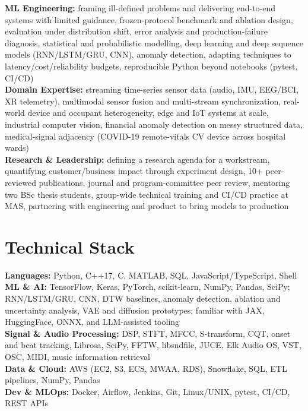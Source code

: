 \documentclass[11pt]{article}
\begin{document}
\textbf{ML Engineering:} framing ill-defined problems and delivering end-to-end systems with limited guidance, frozen-protocol benchmark and ablation design, evaluation under distribution shift, error analysis and production-failure diagnosis, statistical and probabilistic modelling, deep learning and deep sequence models (RNN/LSTM/GRU, CNN), anomaly detection, adapting techniques to latency/cost/reliability budgets, reproducible Python beyond notebooks (pytest, CI/CD)\\
\textbf{Domain Expertise:} streaming time-series sensor data (audio, IMU, EEG/BCI, XR telemetry), multimodal sensor fusion and multi-stream synchronization, real-world device and occupant heterogeneity, edge and IoT systems at scale, industrial computer vision, financial anomaly detection on messy structured data, medical-signal adjacency (COVID-19 remote-vitals CV device across hospital wards)\\
\textbf{Research \& Leadership:} defining a research agenda for a workstream, quantifying customer/business impact through experiment design, 10+ peer-reviewed publications, journal and program-committee peer review, mentoring two BSc thesis students, group-wide technical training and CI/CD practice at MAS, partnering with engineering and product to bring models to production

\section*{Technical Stack}

\textbf{Languages:} Python, C++17, C, MATLAB, SQL, JavaScript/TypeScript, Shell\\
\textbf{ML \& AI:} TensorFlow, Keras, PyTorch, scikit-learn, NumPy, Pandas, SciPy; RNN/LSTM/GRU, CNN, DTW baselines, anomaly detection, ablation and uncertainty analysis, VAE and diffusion prototypes; familiar with JAX, HuggingFace, ONNX, and LLM-assisted tooling\\
\textbf{Signal \& Audio Processing:} DSP, STFT, MFCC, S-transform, CQT, onset and beat tracking, Librosa, SciPy, FFTW, libsndfile, JUCE, Elk Audio OS, VST, OSC, MIDI, music information retrieval\\
\textbf{Data \& Cloud:} AWS (EC2, S3, ECS, MWAA, RDS), Snowflake, SQL, ETL pipelines, NumPy, Pandas\\
\textbf{Dev \& MLOps:} Docker, Airflow, Jenkins, Git, Linux/UNIX, pytest, CI/CD, REST APIs
\end{document}
